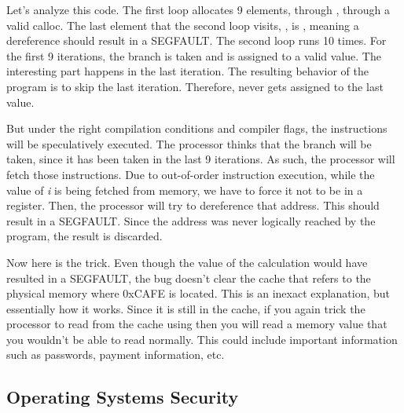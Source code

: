 Let's analyze this code.
The first loop allocates 9 elements,  through , through a valid calloc.
The last element that the second loop visits, , is , meaning a dereference should result in a SEGFAULT.
The second loop runs 10 times.
For the first 9 iterations, the branch is taken and  is assigned to a valid value.
The interesting part happens in the last iteration.
The resulting behavior of the program is to skip the last iteration.
Therefore,  never gets assigned to the last value.

But under the right compilation conditions and compiler flags, the instructions will be speculatively executed.
The processor thinks that the branch will be taken, since it has been taken in the last 9 iterations.
As such, the processor will fetch those instructions.
Due to out-of-order instruction execution, while the value of \emph{i} is being fetched from memory, we have to force it not to be in a register.
Then, the processor will try to dereference that address.
This should result in a SEGFAULT.
Since the address was never logically reached by the program, the result is discarded.

Now here is the trick.
Even though the value of the calculation would have resulted in a SEGFAULT, the bug doesn't clear the cache that refers to the physical memory where 0xCAFE is located. This is an inexact explanation, but essentially how it works.
Since it is still in the cache, if you again trick the processor to read from the cache using  then you will read a memory value that you wouldn't be able to read normally.
This could include important information such as passwords, payment information, etc.

\subsection{Operating Systems Security}

